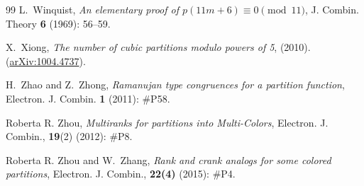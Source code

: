 \documentclass[12pt]{amsart}
\numberwithin{equation}{section}
\theoremstyle{plain}
\theoremstyle{definition}
\begin{document}
\begin{thebibliography}{99}
L.~Winquist, \emph{An elementary proof of $p(11m+6)\equiv 0 \pmod{11}$}, J. Combin. Theory {\bf 6} (1969): 56--59.

X.~Xiong, \emph{The number of cubic partitions modulo powers of 5}, (2010). (\href{http://arxiv.org/abs/1004.4737}{arXiv:1004.4737}).

H.~Zhao and Z.~Zhong, \emph{Ramanujan type congruences for a partition function}, Electron. J. Combin. \textbf{1} (2011): \#P58.

Roberta R. Zhou, \emph{Multiranks for partitions into Multi-Colors}, Electron. J. Combin., {\bf 19}(2) (2012): \#P8.

Roberta R. Zhou and W.~Zhang, \emph{Rank and crank analogs for some colored partitions}, Electron. J. Combin., \textbf{22(4)} (2015): \#P4.



\end{thebibliography}
\end{document}
